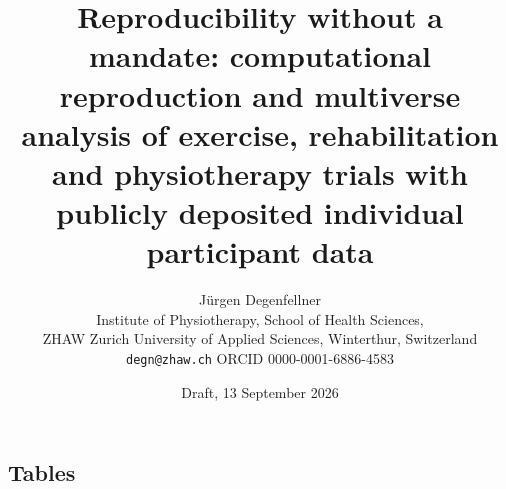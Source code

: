 \documentclass[11pt,a4paper]{article}
\title{Reproducibility without a mandate: computational reproduction and multiverse analysis of exercise, rehabilitation and physiotherapy trials with publicly deposited individual participant data}
\author{J\"urgen Degenfellner\\[4pt]
\normalsize Institute of Physiotherapy, School of Health Sciences,\\
\normalsize ZHAW Zurich University of Applied Sciences, Winterthur, Switzerland\\
\normalsize \texttt{degn@zhaw.ch} \quad ORCID 0000-0001-6886-4583}
\date{Draft, 13 September 2026}
\begin{document}
\maketitle
\begin{abstract}
\noindent

\end{abstract}
\newpage

\clearpage
\begin{landscape}
\section*{Tables}
\footnotesize

\normalsize
\end{landscape}
\clearpage

\end{document}
